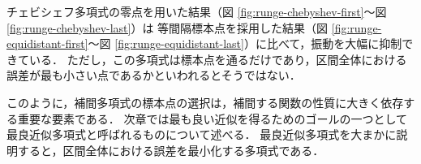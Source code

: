     チェビシェフ多項式の零点を用いた結果（図 \ref{fig:runge-chebyshev-first}～図 \ref{fig:runge-chebyshev-last}）は
    等間隔標本点を採用した結果（図 \ref{fig:runge-equidistant-first}～図 \ref{fig:runge-equidistant-last}）に比べて，振動を大幅に抑制できている．
    ただし，この多項式は標本点を通るだけであり，区間全体における誤差が最も小さい点であるかといわれるとそうではない．
    
    このように，補間多項式の標本点の選択は，補間する関数の性質に大きく依存する重要な要素である．
    次章では最も良い近似を得るためのゴールの一つとして最良近似多項式と呼ばれるものについて述べる．
    最良近似多項式を大まかに説明すると，区間全体における誤差を最小化する多項式である．
\clearpage